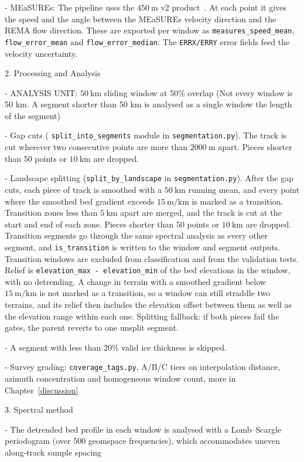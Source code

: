   - MEaSUREs: The pipeline uses the $450~\mathrm{m}$ v2 product~\cite{Rignot_2011}. At each point it gives the speed and the angle between the MEaSUREs velocity direction and the REMA flow direction. These are exported per window as \texttt{measures\_speed\_mean}, \texttt{flow\_error\_mean} and \texttt{flow\_error\_median}. The \texttt{ERRX/ERRY} error fields feed the velocity uncertainty.

2. Processing and Analysis

	- ANALYSIS UNIT: $50~\mathrm{km}$ sliding window at 50\% overlap (Not every window is 50 km. A segment shorter than 50 km is analysed as a single window the length of the segment)

  - Gap cuts ( \texttt{split\_into\_segments} module in  \texttt{segmentation.py}). The track is cut wherever two consecutive points are more than $2000~\mathrm{m}$ apart. Pieces shorter than 50 points or $10~\mathrm{km}$ are dropped.

  - Landscape splitting (\texttt{split\_by\_landscape} in \texttt{segmentation.py}). After the gap cuts, each piece of track is smoothed with a $50~\mathrm{km}$ running mean, and every point where the smoothed bed gradient exceeds $15~\mathrm{m/km}$ is marked as a transition. Transition zones less than $5~\mathrm{km}$ apart are merged, and the track is cut at the start and end of each zone. Pieces shorter than 50 points or $10~\mathrm{km}$ are dropped. Transition segments go through the same spectral analysis as every other segment, and \texttt{is\_transition} is written to the window and segment outputs. Transition windows are excluded from classification and from the validation tests. Relief is \texttt{elevation\_max - elevation\_min} of the bed elevations in the window, with no detrending. A change in terrain with a smoothed gradient below $15~\mathrm{m/km}$ is not marked as a transition, so a window can still straddle two terrains, and its relief then includes the elevation offset between them as well as the elevation range within each one.
  Splitting fallback: if both pieces fail the gates, the parent reverts to one unsplit segment.

  - A segment with less than 20\% valid ice thickness is skipped.

	- Survey grading: \texttt{coverage\_tags.py}, A/B/C tiers on interpolation distance,
   azimuth concentration and homogeneous window count, more in Chapter~\ref{discussion}

3.  Spectral method

  - The detrended bed profile in each window is analysed with a Lomb--Scargle periodogram (over 500 geomspace frequencies), which accommodates uneven along-track sample spacing~\cite{VanderPlas_2018}

